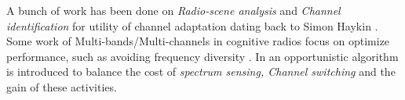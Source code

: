 
A bunch of work has been done on \emph{Radio-scene analysis} and \emph{Channel identification} for utility of channel adaptation dating back to Simon Haykin \cite{haykin2005cognitive}.
Some work of Multi-bands/Multi-channels in
cognitive radios focus on optimize performance, such as avoiding frequency diversity \cite{rahul2009frequency}. 
In \cite{OAR} an opportunistic algorithm is introduced to balance the cost of \emph{spectrum sensing, Channel switching} and the gain of these activities.

%


%
% 
%

